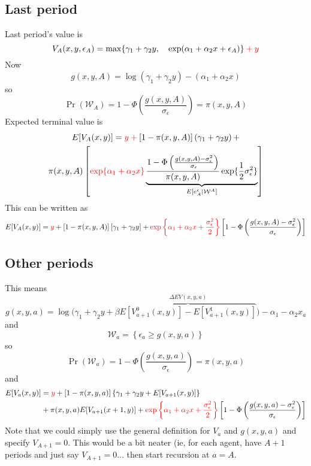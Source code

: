\documentclass[11pt,letterpaper]{article}
\newcommand*{\mathcolor}{}
\def\mathcolor#1#{\mathcoloraux{#1}}
\newcommand*{\mathcoloraux}[3]{%
  \protect\leavevmode
  \begingroup
    \color#1{#2}#3%
  \endgroup
}
\begin{document}
\subsection{Last period}

Last period's value is
\[
V_A(x,y,\epsilon_A) = \max \{ \gamma_1 + \gamma_2 y, \quad \exp(\alpha_1 + \alpha_2 x + \epsilon_A) \} \mathcolor{red}{+ y}
\]
Now
\[
g(x,y,A) = \log(\gamma_1 + \gamma_2 y) - (\alpha_1 + \alpha_2 x)
\]
so 
\[
\Pr(\mathcal W_A) = 1- \Phi\left(\frac{g(x,y,A)}{\sigma_\epsilon} \right) = \pi(x,y,A)
\]
Expected terminal value is
\begin{multline*}
E[V_A(x,y)] = \mathcolor{red}{y +}
    [1-\pi(x,y,A)]\left(\gamma_1 + \gamma_2 y\right)  + \\
    \pi(x,y,A)    \left[\mathcolor{red}{\exp\{\alpha_1 + \alpha_2 x\}} \underbrace{
    \frac{ 1-\Phi\left( \frac{g(x,y,A) - \sigma_\epsilon^2}{\sigma_\epsilon} \right)}
    {\pi(x,y,A)} \exp\{\frac{1}{2}\sigma^2_\epsilon\} }_{E[e^\epsilon_A|\mathcal W^A]} \right]
\end{multline*}
This can be written as
\[
E[V_A(x,y)] = \mathcolor{red}{y} + 
    [1-\pi(x,y,A)]\left[\gamma_1 + \gamma_2 y\right]  + 
    \mathcolor{red}{ \exp\left\{\alpha_1 + \alpha_2 x + \frac{\sigma_\epsilon^2}{2}\right\}}
    \left[1-\Phi\left( \frac{g(x,y,A) - \sigma_\epsilon^2}{\sigma_\epsilon} \right)\right] 
\]

\subsection{Other periods}
This means
\[
    g(x,y,a) = \log \bigg( \gamma_1 + \gamma_2 y + \beta\overbrace{E[V_{a+1}^0(x,y)] - E[V_{a+1}^1(x,y)]}^{\Delta EV(x,y,a)} \bigg) - \alpha_1 - \alpha_2 x_a 
\]
and
\[
\mathcal W_a = \left\{\epsilon_a \geq g(x,y,a) \right\}
\]
so
\[
\Pr(\mathcal W_a) = 1- \Phi\left(\frac{g(x,y,a)}{\sigma_\epsilon} \right) = \pi(x,y,a)
\]
and
\begin{align*}
E[V_a(x,y)] 
&= \mathcolor{red}{y}  
+ [1-\pi(x,y,a)]\left\{\gamma_1 + \gamma_2 y + E[V_{a+1}(x,y)] \right\}  \\ 
&+ \pi(x,y,a)E[V_{a+1}(x+1,y)] + \mathcolor{red}{ \exp\left\{\alpha_1 + \alpha_2 x + \frac{\sigma_\epsilon^2}{2}\right\}}
    \left[1-\Phi\left( \frac{g(x,y,a) - \sigma_\epsilon^2}{\sigma_\epsilon} \right)\right] 
\end{align*}
Note that we could simply use the general definition for $V_a$ and $g(x,y,a)$ and specify $V_{A+1} = 0$. This would be a bit neater (ie, for each agent, have $A+1$ periods and just say $V_{A+1} = 0$... then start recursion at $a=A$.  
\end{document}
